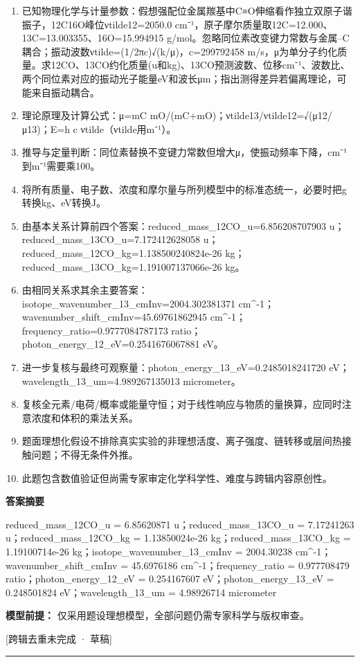 \documentclass[UTF8,11pt,a4paper]{ctexart}
\begin{document}
\begin{enumerate}
\item 已知物理化学与计量参数：假想强配位金属羰基中C≡O伸缩看作独立双原子谐振子，12C16O峰位νtilde12=2050.0 cm⁻¹，原子摩尔质量取12C=12.000、13C=13.003355、16O=15.994915 g/mol。忽略同位素改变键力常数与金属–C耦合；振动波数νtilde=(1/2πc)√(k/μ)，c=299792458 m/s，μ为单分子约化质量。求12CO、13CO约化质量(u和kg)、13CO预测波数、位移cm⁻¹、波数比、两个同位素对应的振动光子能量eV和波长μm；指出测得差异若偏离理论，可能来自振动耦合。
\item 理论原理及计算公式：μ=mC mO/(mC+mO)；νtilde13/νtilde12=√(μ12/μ13)；E=h c νtilde（νtilde用m⁻¹）。
\item 推导与定量判断：同位素替换不变键力常数但增大μ，使振动频率下降，cm⁻¹到m⁻¹需要乘100。
\item 将所有质量、电子数、浓度和摩尔量与所列模型中的标准态统一，必要时把g转换kg、eV转换J。
\item 由基本关系计算前四个答案：reduced\_mass\_12CO\_u=6.856208707903 u；reduced\_mass\_13CO\_u=7.172412628058 u；reduced\_mass\_12CO\_kg=1.138500240824e-26 kg；reduced\_mass\_13CO\_kg=1.191007137066e-26 kg。
\item 由相同关系求其余主要答案：isotope\_wavenumber\_13\_cmInv=2004.302381371 cm\textasciicircum{}-1；wavenumber\_shift\_cmInv=45.69761862945 cm\textasciicircum{}-1；frequency\_ratio=0.9777084787173 ratio；photon\_energy\_12\_eV=0.2541676067881 eV。
\item 进一步复核与最终可观察量：photon\_energy\_13\_eV=0.2485018241720 eV；wavelength\_13\_um=4.989267135013 micrometer。
\item 复核全元素/电荷/概率或能量守恒；对于线性响应与物质的量换算，应同时注意浓度和体积的乘法关系。
\item 题面理想化假设不排除真实实验的非理想活度、离子强度、链转移或层间热接触问题；不得无条件外推。
\item 此题包含数值验证但尚需专家审定化学科学性、难度与跨辑内容原创性。
\end{enumerate}
\noindent\textbf{答案摘要}\par
reduced\_mass\_12CO\_u = 6.85620871 u；reduced\_mass\_13CO\_u = 7.17241263 u；reduced\_mass\_12CO\_kg = 1.13850024e-26 kg；reduced\_mass\_13CO\_kg = 1.19100714e-26 kg；isotope\_wavenumber\_13\_cmInv = 2004.30238 cm\textasciicircum{}-1；wavenumber\_shift\_cmInv = 45.6976186 cm\textasciicircum{}-1；frequency\_ratio = 0.977708479 ratio；photon\_energy\_12\_eV = 0.254167607 eV；photon\_energy\_13\_eV = 0.248501824 eV；wavelength\_13\_um = 4.98926714 micrometer\par
\noindent\textbf{模型前提：}
仅采用题设理想模型，全部问题仍需专家科学与版权审查。\par
\noindent\textcolor{red!65!black}{[跨辑去重未完成 · 草稿]} \par
\medskip\hrule\medskip
{}
\end{document}
